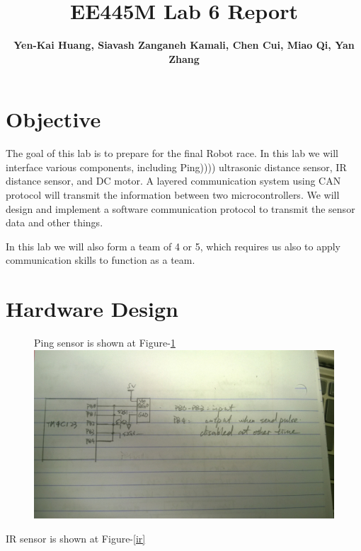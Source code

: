 \documentclass[a4paper]{article}
\newlength{\pic}
\begin{document}
\title{EE445M Lab 6 Report}
\author{\bfseries Yen-Kai Huang, Siavash Zanganeh Kamali, Chen Cui, Miao Qi, Yan Zhang}
\maketitle

\section{Objective} The goal of this lab is to prepare for the final Robot race. In this lab we will interface various
components, including Ping)))) ultrasonic distance sensor, IR distance sensor, and DC motor. A layered communication system
using CAN protocol will transmit the information between two microcontrollers. We will design and implement a software
communication protocol to transmit the sensor data and other things.

In this lab we will also form a team of 4 or 5, which requires us also to apply communication skills to function as a team.

\section{Hardware Design}
\setlength{\pic}{0.8\textwidth}
\begin{figure}[htp]
\noindent Ping sensor is shown at Figure-\ref{ping}
\center
\includegraphics[width=\pic]{circuits/Ping_Circuit}
\caption{ }
\label{ping}
\end{figure}

IR sensor is shown at Figure-\ref{ir}
\end{document}
